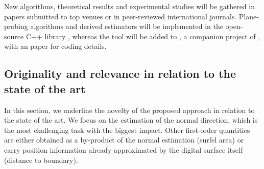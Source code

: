 New algorithms, theoretical results and experimental studies will be gathered in papers submitted to
top venues or in peer-reviewed international journals. Plane-probing algorithms and derived estimators
will be implemented in the open-source C++ library {\DGtal}, whereas the tool will be added to {\DGtalTools},
a companion project of {\DGtal}, with an {\IPOL} paper for coding details.  

 


\subsection{Originality and relevance in relation to the state of the art}
\label{sec:art}


In this section, we underline the novelty of the proposed approach in relation to the state of the art.  
We focus on the estimation of the normal direction, which is the most challenging task with the biggest impact. 
Other first-order quantities are either obtained as a by-product of the normal estimation (\eg surfel area)
or carry position information already approximated by the digital surface itself (\eg distance to boundary).

